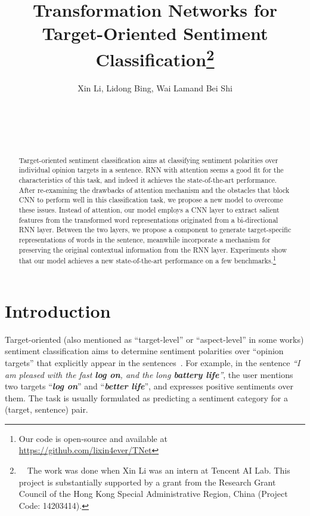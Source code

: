 \documentclass[11pt,a4paper]{article}
\title{Transformation Networks for Target-Oriented Sentiment Classification\thanks{\ \ The work was done when Xin Li was an intern at Tencent AI Lab. This project is substantially supported by a grant from the Research Grant Council of the Hong Kong Special Administrative Region, China (Project Code: 14203414).}}
\author{Xin Li\affmark[1], Lidong Bing\affmark[2], Wai Lam\affmark[1] and
Bei Shi\affmark[1]\\
\affaddr{\affmark[1]Department of Systems Engineering and Engineering Management\\
The Chinese University of Hong Kong, Hong Kong}\\
\affaddr{\affmark[2]Tencent AI Lab, Shenzhen, China}\\
\email{\{lixin,wlam,bshi\}@se.cuhk.edu.hk}\\
\email{lyndonbing@tencent.com}\\
}
\date{}
\begin{document}
\maketitle
\begin{abstract}
 Target-oriented sentiment classification aims at classifying sentiment polarities over individual opinion targets in a sentence. RNN with attention seems a good fit for the characteristics of this task, and indeed it achieves the state-of-the-art performance. After re-examining the drawbacks of attention mechanism and the obstacles that block CNN to perform well in this classification task, we propose a new model to overcome these issues. Instead of attention, our model employs a CNN layer to extract salient features from the transformed word representations originated from a bi-directional RNN layer. Between the two layers, we propose a component to  generate target-specific representations of words in the sentence, meanwhile incorporate a mechanism for preserving the original contextual information from the RNN layer. Experiments show that our model achieves a new state-of-the-art performance on a few benchmarks.\footnote{Our code is open-source and available at \url{https://github.com/lixin4ever/TNet}} 
 
\end{abstract}

\vspace{2mm}

\section{Introduction}
\label{sec:intro}
Target-oriented (also mentioned as ``target-level'' or ``aspect-level'' in some works) sentiment classification aims to determine sentiment polarities over ``opinion targets'' that explicitly appear in the sentences~\cite{liu2012sentiment}. For example, in the sentence \textit{``I am pleased with the fast \textbf{log on}, and the long \textbf{battery life}''}, the user mentions two targets ``\textit{\textbf{log on}}'' and ``\textit{\textbf{better life}}'', and expresses positive sentiments over them. 
The task is usually formulated as predicting a sentiment category for a (target, sentence) pair. 
\end{document}
